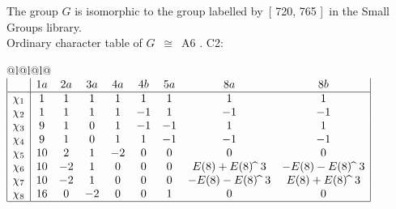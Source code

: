 \documentclass[varwidth=\maxdimen,border=10]{standalone}
\begin{document}
The group $G$ is isomorphic to the group labelled by\ [ 720, 765 ]\ in the Small Groups library.\\
Ordinary character table of $G$\ $\cong$\ A6 . C2:\\
\begin{center}
\begin{tabular}{@{}l@{}l@{}l@{}}
\hline
\(\begin{array}{|l|cccccccc|}
  & 1a & 2a & 3a & 4a & 4b & 5a & 8a & 8b\\ \hline
\chi_{1} & 1 & 1 & 1 & 1 & 1 & 1 & 1 & 1\\
\chi_{2} & 1 & 1 & 1 & 1 & -1 & 1 & -1 & -1\\
\chi_{3} & 9 & 1 & 0 & 1 & -1 & -1 & 1 & 1\\
\chi_{4} & 9 & 1 & 0 & 1 & 1 & -1 & -1 & -1\\
\chi_{5} & 10 & 2 & 1 & -2 & 0 & 0 & 0 & 0\\
\chi_{6} & 10 & -2 & 1 & 0 & 0 & 0 & E(8)+E(8) \widehat{\ }\ {3} & -E(8)-E(8) \widehat{\ }\ {3}\\
\chi_{7} & 10 & -2 & 1 & 0 & 0 & 0 & -E(8)-E(8) \widehat{\ }\ {3} & E(8)+E(8) \widehat{\ }\ {3}\\
\chi_{8} & 16 & 0 & -2 & 0 & 0 & 1 & 0 & 0\\
\hline
\end{array}\)\\
\end{tabular}
\end{center}
\end{document}
